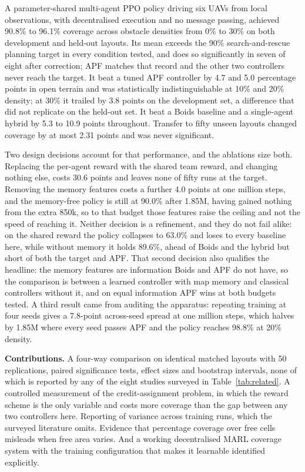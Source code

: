 \documentclass[a4paper, 10pt, conference]{ieeeconf}
\begin{document}
A parameter-shared multi-agent PPO policy driving six UAVs from local
observations, with decentralised execution and no message passing,
achieved 90.8\%
to 96.1\% coverage across obstacle densities from 0\% to 30\% on both
development and held-out layouts. Its mean exceeds the 90\%
search-and-rescue planning target in every condition tested, and does
so significantly in seven of eight after correction; APF matches that
record and the other two controllers never reach the target. It beat a tuned APF controller by 4.7 and 5.0
percentage points in open terrain and was statistically
indistinguishable at 10\% and 20\% density; at 30\% it trailed by 3.8
points on the development set, a difference that did not replicate on
the held-out set. It beat a Boids baseline and a single-agent hybrid
by 5.3 to 10.9 points throughout. Transfer to fifty unseen layouts
changed coverage by at most 2.31 points and was never significant.

Two design decisions account for that performance, and the ablations
size both. Replacing the per-agent reward with the shared team reward,
and changing nothing else, costs 30.6 points and leaves none of fifty
runs at the target. Removing the memory features costs a further 4.0 points at one million
steps, and the memory-free policy is still at 90.0\% after 1.85M,
having gained nothing from the extra 850k, so to that budget those
features raise the ceiling and not the speed of reaching it. Neither
decision is a refinement, and they do not fail alike: on the shared
reward the policy collapses to 63.0\% and loses to every baseline
here, while without memory it holds 89.6\%, ahead of Boids and the
hybrid but short of both the target and APF. That second decision also qualifies the headline:
the memory features are information Boids and APF do not have, so the
comparison is between a learned controller with map memory and
classical controllers without it, and on equal information APF wins at
both budgets tested. A third result came from auditing the apparatus:
repeating training at four seeds gives a 7.8-point across-seed spread
at one million steps, which halves by 1.85M where every seed passes
APF and the policy reaches 98.8\% at 20\% density.

\textbf{Contributions.} A four-way comparison on identical matched
layouts with 50 replications, paired significance tests, effect sizes
and bootstrap intervals, none of which is reported by any of the eight
studies surveyed in Table~\ref{tab:related}.
A controlled measurement of the credit-assignment problem, in which
the reward scheme is the only variable and costs more coverage than
the gap between any two controllers here. Reporting of variance across
training runs, which the surveyed literature omits. Evidence that
percentage coverage over free cells misleads when free area varies.
And a working decentralised MARL coverage system with the training
configuration that makes it learnable identified explicitly.
\end{document}
